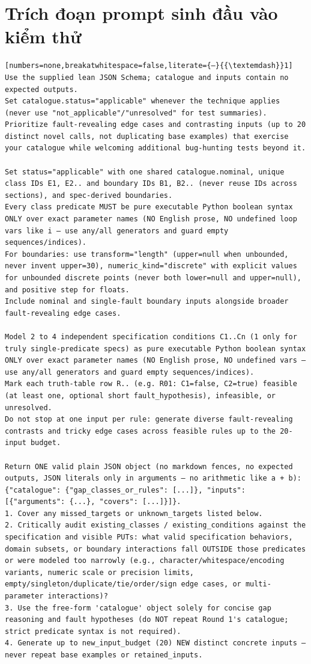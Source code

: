 \chapter{Trích đoạn prompt sinh đầu vào kiểm thử}
\label{app:reproduction}

\begin{lstlisting}[numbers=none,breakatwhitespace=false,literate={—}{{\textemdash}}1]
Use the supplied lean JSON Schema; catalogue and inputs contain no expected outputs.
Set catalogue.status="applicable" whenever the technique applies (never use "not_applicable"/"unresolved" for test summaries).
Prioritize fault-revealing edge cases and contrasting inputs (up to 20 distinct novel calls, not duplicating base examples) that exercise your catalogue while welcoming additional bug-hunting tests beyond it.

Set status="applicable" with one shared catalogue.nominal, unique class IDs E1, E2.. and boundary IDs B1, B2.. (never reuse IDs across sections), and spec-derived boundaries.
Every class predicate MUST be pure executable Python boolean syntax ONLY over exact parameter names (NO English prose, NO undefined loop vars like i — use any/all generators and guard empty sequences/indices).
For boundaries: use transform="length" (upper=null when unbounded, never invent upper=30), numeric_kind="discrete" with explicit values for unbounded discrete points (never both lower=null and upper=null), and positive step for floats.
Include nominal and single-fault boundary inputs alongside broader fault-revealing edge cases.

Model 2 to 4 independent specification conditions C1..Cn (1 only for truly single-predicate specs) as pure executable Python boolean syntax ONLY over exact parameter names (NO English prose, NO undefined vars — use any/all generators and guard empty sequences/indices).
Mark each truth-table row R.. (e.g. R01: C1=false, C2=true) feasible (at least one, optional short fault_hypothesis), infeasible, or unresolved.
Do not stop at one input per rule: generate diverse fault-revealing contrasts and tricky edge cases across feasible rules up to the 20-input budget.

Return ONE valid plain JSON object (no markdown fences, no expected outputs, JSON literals only in arguments — no arithmetic like a + b): {"catalogue": {"gap_classes_or_rules": [...]}, "inputs": [{"arguments": {...}, "covers": [...]}]}.
1. Cover any missed_targets or unknown_targets listed below.
2. Critically audit existing_classes / existing_conditions against the specification and visible PUTs: what valid specification behaviors, domain subsets, or boundary interactions fall OUTSIDE those predicates or were modeled too narrowly (e.g., character/whitespace/encoding variants, numeric scale or precision limits, empty/singleton/duplicate/tie/order/sign edge cases, or multi-parameter interactions)?
3. Use the free-form 'catalogue' object solely for concise gap reasoning and fault hypotheses (do NOT repeat Round 1's catalogue; strict predicate syntax is not required).
4. Generate up to new_input_budget (20) NEW distinct concrete inputs — never repeat base examples or retained_inputs.

\end{lstlisting}

